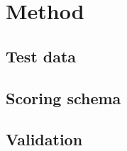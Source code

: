 \documentclass[thesis.tex]{subfiles}
\begin{document}
\chapter{Method}
\section{Test data}
\section{Scoring schema}
\section{Validation}
\end{document}
